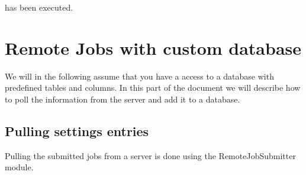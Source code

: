 \documentclass[letterpaper,10pt,english]{sphinxmanual}
\begin{document}
has been executed.


\chapter{Remote Jobs with custom database}
\label{webinterface:remote-jobs-with-custom-database}
We will in the following assume that you have a access to a database
with predefined tables and columns. In this part of the document we will
describe how to poll the information from the server and add it to a
database.


\section{Pulling settings entries}
\label{webinterface:pulling-settings-entries}
Pulling the submitted jobs from a server is done using the
RemoteJobSubmitter module.
\end{document}
